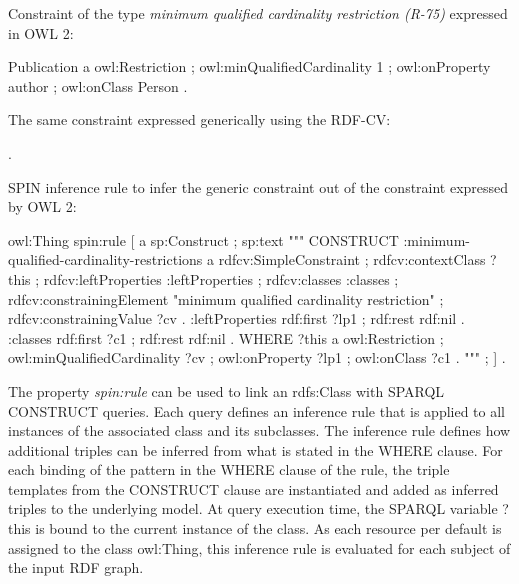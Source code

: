 \documentclass[a4paper,fontsize=11pt]{scrartcl}
\begin{document}
Constraint of the type \emph{minimum qualified cardinality restriction (R-75)} expressed in OWL 2:

\begin{ex}[commandchars=\\\{\}]
Publication 
    a owl:Restriction ;
    owl:minQualifiedCardinality 1 ;
    owl:onProperty author ;
    owl:onClass Person .
\end{ex}

The same constraint expressed generically using the RDF-CV:

\begin{ex} .
\end{ex}

SPIN inference rule to infer the generic constraint out of the constraint expressed by OWL 2:

\begin{ex}
owl:Thing 
    spin:rule [ a sp:Construct ; sp:text """
        CONSTRUCT {            
            :minimum-qualified-cardinality-restrictions
                a rdfcv:SimpleConstraint ;
                rdfcv:contextClass ?this ;
                rdfcv:leftProperties :leftProperties ;
                rdfcv:classes :classes ;
                rdfcv:constrainingElement "minimum qualified cardinality restriction" ;
                rdfcv:constrainingValue ?cv .  
            :leftProperties 
                rdf:first ?lp1 ;
                rdf:rest rdf:nil .    
            :classes 
                rdf:first ?c1 ;
                rdf:rest rdf:nil . }
        WHERE {
            ?this
                a owl:Restriction ;
                owl:minQualifiedCardinality ?cv ;
                owl:onProperty ?lp1 ;
                owl:onClass ?c1 . } """ ; ] .
\end{ex}

The property \emph{spin:rule} can be used to link an rdfs:Class with SPARQL CONSTRUCT queries. Each query defines an inference rule that is applied to all instances of the associated class and its subclasses. The inference rule defines how additional triples can be inferred from what is stated in the WHERE clause. For each binding of the pattern in the WHERE clause of the rule, the triple templates from the CONSTRUCT clause are instantiated and added as inferred triples to the underlying model. At query execution time, the SPARQL variable ?this is bound to the current instance of the class. As each resource per default is assigned to the class owl:Thing, this inference rule is evaluated for each subject of the input RDF graph.
\end{document}
